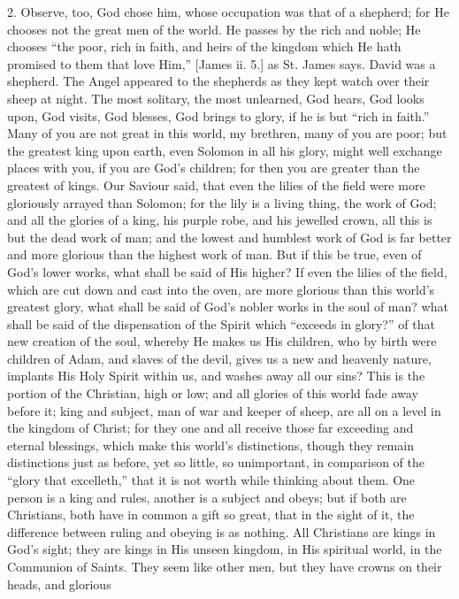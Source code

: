 2. Observe, too, God chose him, whose occupation was that of a
shepherd; for He chooses not the great men of the world. He passes by
the rich and noble; He chooses ``the poor, rich in faith, and
heirs of the kingdom which He hath promised to them that love
Him,'' [James ii. 5.] as St. James says. David was a shepherd.
The
Angel appeared to the shepherds as they kept watch over their sheep at
night. The most solitary, the most unlearned, God hears, God looks
upon, God visits, God blesses, God brings to glory, if he is but
``rich in faith.'' Many of you are not great in this world, my
brethren, many of you are poor; but the greatest king upon earth, even
Solomon in all his glory, might well exchange places with you, if you
are God's children; for then you are greater than the greatest of
kings. Our Saviour said, that even the lilies of the field were more
gloriously arrayed than Solomon; for the lily is a living thing, the
work of God; and all the glories of a king, his purple robe, and his
jewelled crown, all this is but the dead work of man; and the lowest
and humblest work of God is far better and more glorious than the
highest work of man. But if this be true, even of God's lower works,
what shall be said of His higher? If even the lilies of the field,
which are cut down and cast into the oven, are more glorious than this
world's greatest glory, what shall be said of God's nobler works in
the soul of man? what shall be said of the dispensation of the Spirit
which ``exceeds in glory?'' of that new creation of the soul,
whereby He makes us His children, who by birth were children of Adam,
and slaves of the devil, gives us a new and heavenly nature, implants
His Holy Spirit within us, and washes away all our sins? This is the
portion of the Christian, high or low; and all glories of this world
fade away before it; king and subject, man of war and keeper of sheep,
are all on a level in the kingdom of Christ; for they one and all
receive those far exceeding and eternal blessings, which make this
world's distinctions, though they remain distinctions just as before,
yet so little, so unimportant, in comparison of the ``glory that
excelleth,'' that it is not worth while thinking about them. One
person is a king and rules, another is a subject and obeys; but if
both are Christians, both have in common a gift so great, that in the
sight of it, the difference between ruling and obeying is as nothing.
All Christians are kings in God's sight; they are kings in His unseen
kingdom, in His spiritual world, in the Communion of Saints. They seem
like other men, but they have crowns on their heads, and glorious
